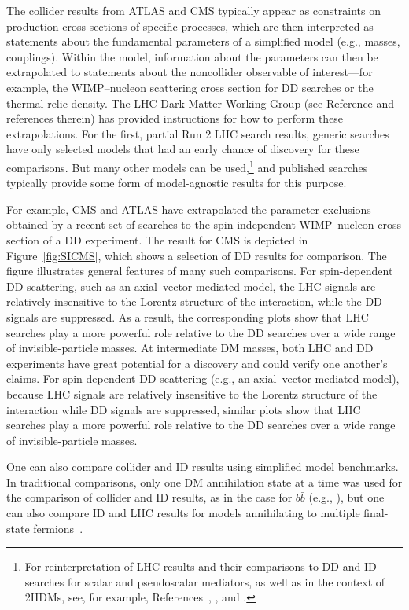 \documentclass{ar-1col}
\begin{document}
{The collider results from ATLAS and CMS typically appear as constraints
on production cross sections of specific processes, which are then
interpreted as statements about the fundamental parameters of a
simplified model (e.g., masses, couplings). Within the model,
information about the parameters can then be extrapolated to
statements about the noncollider observable of interest---for
example, the WIMP--nucleon scattering cross section for DD searches or the
thermal relic density. The LHC Dark
Matter Working Group (see Reference  and references therein) has provided instructions for how to
perform these extrapolations. For the first, partial Run 2 LHC search results, 
generic searches have only selected models that had an early chance of discovery 
for these comparisons. But many other
models can be used,\footnote{For reinterpretation of LHC results
and their comparisons to DD and ID searches for scalar and pseudoscalar
mediators, as well as in the context of 2HDMs, see, for example, References~, , and .} and
published searches typically provide some form of model-agnostic
results for this purpose.

For example, CMS and ATLAS have extrapolated the parameter exclusions
obtained by a recent set of searches to the spin-independent
WIMP--nucleon cross section of a DD experiment. The
result for CMS is depicted in Figure~\ref{fig:SICMS}, which shows a selection of DD results
for comparison. The figure illustrates general features of
many such comparisons. For spin-dependent DD scattering, such as an axial--vector mediated model, the LHC signals are relatively insensitive to the Lorentz structure of the interaction, while the DD signals are suppressed. As a result, the corresponding plots show that LHC searches play a more powerful role relative to the DD searches over a wide range of invisible-particle masses. At intermediate DM masses,
both LHC and DD experiments have great potential for a discovery
and could verify one another's claims. For spin-dependent DD
scattering (e.g., an axial--vector mediated model), because LHC
signals are relatively insensitive to the Lorentz structure of the
interaction while DD signals are suppressed, similar plots
show that LHC searches play a more powerful role relative to the
DD searches over a wide range of invisible-particle masses.

One can also compare collider and ID results using
simplified model benchmarks. In traditional comparisons, only one
DM annihilation state at a time was used for the comparison
of collider and ID results, as in the case for $b\bar{b}$ (e.g., ), but one can also compare ID and
LHC results for models annihilating to multiple final-state
fermions~\cite{Carpenter:2016thc}.

}
\end{document}
